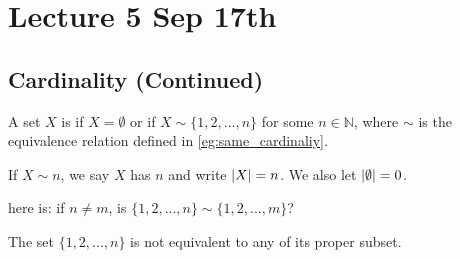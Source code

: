 \documentclass[notoc,notitlepage]{tufte-book}
\begin{document}

\chapter{Lecture 5 Sep 17th}%
\label{chp:lecture_5_sep_17th}

\section{Cardinality (Continued)}%
\label{sec:cardinality_continued}

\begin{defn}
\label{defn:finite_sets}
  A set $X$ is  if $X = \emptyset$ or if $X \sim \{ 1, 2, ..., n \}$ for some $n \in \mathbb{N}$, where $\sim$ is the equivalence relation defined in \cref{eg:same_cardinaliy}.
\end{defn}

\begin{defn}[Cardinality]
\label{defn:cardinality}
  If $X \sim n$, we say $X$ has  $n$ and write $\left|X\right| = n$. We also let $\left|\emptyset\right| = 0$.
\end{defn}

 here is: if $n \neq m$, is $\{1, 2, ..., n \} \sim \{ 1, 2, ..., m \}$?

\begin{thm}
\label{thm:pigeonhole_principle}
  The set $\{1, 2, ..., n\}$ is not equivalent to any of its proper subset.
\end{thm}
\end{document}
